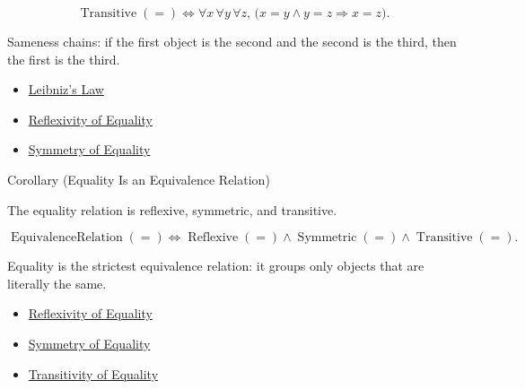 \begin{remark*}
\[
\operatorname{Transitive}(=)
\Longleftrightarrow
\forall x\,\forall y\,\forall z,\,
\bigl(x=y \land y=z \Longrightarrow x=z\bigr).
\]
\end{remark*}

\begin{remark*}[Interpretation]
Sameness chains: if the first object is the second and the second is the
third, then the first is the third.
\end{remark*}

\begin{dependencies}
\begin{itemize}
  \item \hyperref[ax:leibniz-law]{Leibniz's Law}
  \item \hyperref[ax:equality-reflexivity]{Reflexivity of Equality}
  \item \hyperref[thm:equality-symmetry]{Symmetry of Equality}
\end{itemize}
\end{dependencies}

\begin{corollarybox}{Corollary (Equality Is an Equivalence Relation)}
\begin{corollary}
\label{cor:equality-is-equivalence-relation}
The equality relation is reflexive, symmetric, and transitive.
\end{corollary}
\end{corollarybox}

\begin{remark*}
\[
\operatorname{EquivalenceRelation}(=)
\Longleftrightarrow
\operatorname{Reflexive}(=)\land\operatorname{Symmetric}(=)\land\operatorname{Transitive}(=).
\]
\end{remark*}

\begin{remark*}[Interpretation]
Equality is the strictest equivalence relation: it groups only objects that
are literally the same.
\end{remark*}

\begin{dependencies}
\begin{itemize}
  \item \hyperref[ax:equality-reflexivity]{Reflexivity of Equality}
  \item \hyperref[thm:equality-symmetry]{Symmetry of Equality}
  \item \hyperref[thm:equality-transitivity]{Transitivity of Equality}
\end{itemize}
\end{dependencies}

